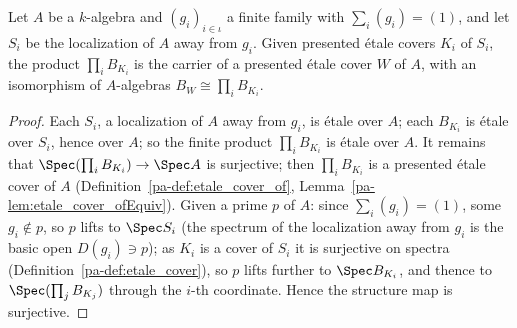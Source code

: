 \begin{theorem}
  \label{pa-thm:PicEtAff_exists_etaleCover_pi}
  \leanok

  Let \(A\) be a \(k\)-algebra and \((g_i)_{i \in \iota}\) a finite family with
  \(\sum_i (g_i) = (1)\), and let \(S_i\) be the localization of \(A\) away from \(g_i\). Given
  presented \'etale covers \(K_i\) of \(S_i\), the product \(\prod_i B_{K_i}\) is the carrier of a
  presented \'etale cover \(W\) of \(A\), with an isomorphism of \(A\)-algebras \(B_W \cong
  \prod_i B_{K_i}\).
\end{theorem}
\begin{proof}
  \leanok
  Each \(S_i\), a localization of \(A\) away from \(g_i\), is \'etale over \(A\); each \(B_{K_i}\)
  is \'etale over \(S_i\), hence over \(A\); so the finite product \(\prod_i B_{K_i}\) is \'etale
  over \(A\). It remains that \(\Spec(\prod_i B_{K_i}) \to \Spec A\) is surjective; then
  \(\prod_i B_{K_i}\) is a presented \'etale cover of \(A\) (Definition~\ref{pa-def:etale_cover_of},
  Lemma~\ref{pa-lem:etale_cover_ofEquiv}). Given a prime \(p\) of \(A\): since
  \(\sum_i (g_i) = (1)\), some \(g_i \notin p\), so \(p\) lifts to \(\Spec S_i\) (the spectrum of
  the localization away from \(g_i\) is the basic open \(D(g_i) \ni p\)); as \(K_i\) is a cover of
  \(S_i\) it is surjective on spectra (Definition~\ref{pa-def:etale_cover}), so \(p\) lifts further to
  \(\Spec B_{K_i}\), and thence to \(\Spec(\prod_j B_{K_j})\) through the \(i\)-th coordinate. Hence
  the structure map is surjective.
\end{proof}

